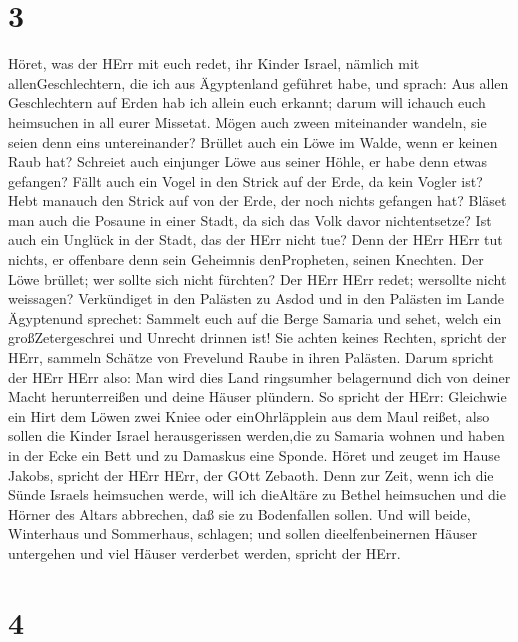 \hypertarget{section-2}{%
\section{3}\label{section-2}}

 Höret, was der HErr mit euch redet, ihr Kinder Israel,
nämlich mit allenGeschlechtern, die ich aus Ägyptenland geführet habe,
und sprach:  Aus allen Geschlechtern auf Erden hab ich
allein euch erkannt; darum will ichauch euch heimsuchen in all eurer
Missetat.  Mögen auch zween miteinander wandeln, sie seien
denn eins untereinander?  Brüllet auch ein Löwe im Walde,
wenn er keinen Raub hat? Schreiet auch einjunger Löwe aus seiner Höhle,
er habe denn etwas gefangen?  Fällt auch ein Vogel in den
Strick auf der Erde, da kein Vogler ist? Hebt manauch den Strick auf von
der Erde, der noch nichts gefangen hat?  Bläset man auch die
Posaune in einer Stadt, da sich das Volk davor nichtentsetze? Ist auch
ein Unglück in der Stadt, das der HErr nicht tue?  Denn der
HErr HErr tut nichts, er offenbare denn sein Geheimnis denPropheten,
seinen Knechten.  Der Löwe brüllet; wer sollte sich nicht
fürchten? Der HErr HErr redet; wersollte nicht weissagen? 
Verkündiget in den Palästen zu Asdod und in den Palästen im Lande
Ägyptenund sprechet: Sammelt euch auf die Berge Samaria und sehet, welch
ein großZetergeschrei und Unrecht drinnen ist!  Sie achten
keines Rechten, spricht der HErr, sammeln Schätze von Frevelund Raube in
ihren Palästen.  Darum spricht der HErr HErr also: Man wird
dies Land ringsumher belagernund dich von deiner Macht herunterreißen
und deine Häuser plündern.  So spricht der HErr: Gleichwie
ein Hirt dem Löwen zwei Kniee oder einOhrläpplein aus dem Maul reißet,
also sollen die Kinder Israel herausgerissen werden,die zu Samaria
wohnen und haben in der Ecke ein Bett und zu Damaskus eine Sponde.
 Höret und zeuget im Hause Jakobs, spricht der HErr HErr,
der GOtt Zebaoth.  Denn zur Zeit, wenn ich die Sünde
Israels heimsuchen werde, will ich dieAltäre zu Bethel heimsuchen und
die Hörner des Altars abbrechen, daß sie zu Bodenfallen sollen.
 Und will beide, Winterhaus und Sommerhaus, schlagen; und
sollen dieelfenbeinernen Häuser untergehen und viel Häuser verderbet
werden, spricht der HErr.

\hypertarget{section-3}{%
\section{4}\label{section-3}}

